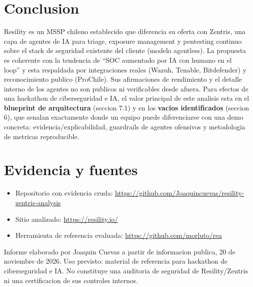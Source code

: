 \documentclass[11pt,a4paper]{article}
\begin{document}
\section{Conclusion}

Resility es un MSSP chileno establecido que diferencia su oferta con Zentris, una capa de
agentes de IA para triage, exposure management y pentesting continuo sobre el stack de
seguridad existente del cliente (modelo agentless). La propuesta es coherente con la tendencia
de ``SOC aumentado por IA con humano en el loop'' y esta respaldada por integraciones reales
(Wazuh, Tenable, Bitdefender) y reconocimiento publico (ProChile). Sus afirmaciones de
rendimiento y el detalle interno de los agentes no son publicos ni verificables desde afuera.
Para efectos de una hackathon de ciberseguridad e IA, el valor principal de este analisis esta
en el \textbf{blueprint de arquitectura} (seccion 7.1) y en los \textbf{vacios identificados}
(seccion 6), que senalan exactamente donde un equipo puede diferenciarse con una demo concreta:
evidencia/explicabilidad, guardrails de agentes ofensivos y metodologia de metricas reproducible.

\section{Evidencia y fuentes}

\begin{itemize}[leftmargin=1.4em]
  \item Repositorio con evidencia cruda:
  \url{https://github.com/Joaquincuevas/resility-zentris-analysis}
  \item Sitio analizado: \url{https://resility.io/}
  \item Herramienta de referencia evaluada: \url{https://github.com/morluto/rea}
\end{itemize}

\vspace{1em}
\noindent\small\color{brandgray}
Informe elaborado por Joaquin Cuevas a partir de informacion publica, 20 de noviembre de 2026.
Uso previsto: material de referencia para hackathon de ciberseguridad e IA. No constituye una
auditoria de seguridad de Resility/Zentris ni una certificacion de sus controles internos.
\end{document}
